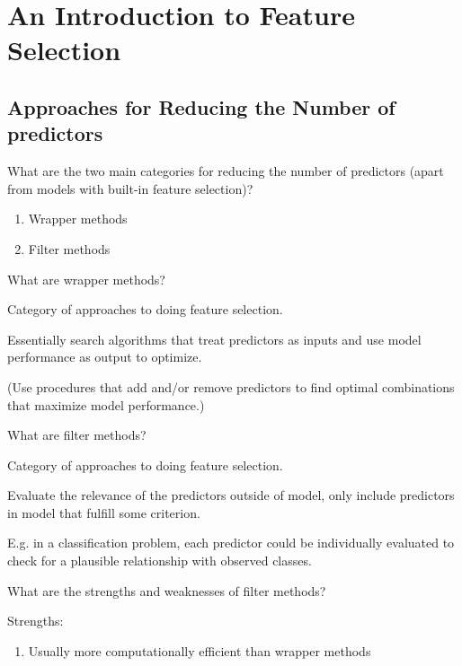 \documentclass[10pt]{book}
\begin{document}
\tableofcontents

\chapter{An Introduction to Feature Selection} %
\label{chap:an_introduction_to_feature_selection}

\section{Approaches for Reducing the Number of predictors} %
\label{sec:approaches_for_reducing_the_number_of_predictors}

What are the two main categories for reducing the number of predictors (apart from models with built-in feature selection)?

\begin{enumerate}
  \item Wrapper methods
  \item Filter methods
\end{enumerate}

\hrulefill

What are wrapper methods?

Category of approaches to doing feature selection.

Essentially search algorithms that treat predictors as inputs and use model performance as output to optimize.

(Use procedures that add and/or remove predictors to find optimal combinations that maximize model performance.)

\hrulefill

What are filter methods?

Category of approaches to doing feature selection.

Evaluate the relevance of the predictors outside of model, only include predictors in model that fulfill some criterion. 

E.g. in a classification problem, each predictor could be individually evaluated to check for a plausible relationship with observed classes.

\hrulefill

What are the strengths and weaknesses of filter methods?

Strengths:
\begin{enumerate}
  \item Usually more computationally efficient than wrapper methods
\end{enumerate}
\end{document}

